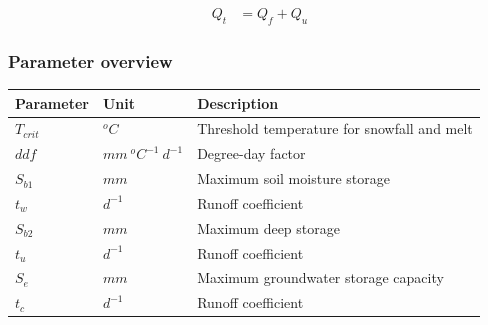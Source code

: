 \begin{align}
	Q_t &= Q_f + Q_u
\end{align}

\subsubsection{Parameter overview}
\begin{table}[htbp]
  \centering
    \begin{tabular}{lll}
    \toprule
    Parameter & Unit  & Description \\
    \midrule
    $T_{crit}$ & $^oC$ & Threshold temperature for snowfall and melt \\
    $ddf$ & $mm~^oC^{-1}~d^{-1}$ & Degree-day factor \\
    $S_{b1}$ & $mm$  & Maximum soil moisture storage \\
    $t_w$ & $d^{-1}$ & Runoff coefficient \\
    $S_{b2}$ & $mm$  & Maximum deep storage \\
    $t_u$ & $d^{-1}$ & Runoff coefficient \\
    $S_e$ & $mm$  & Maximum groundwater storage capacity \\
    $t_c$ & $d^{-1}$ & Runoff coefficient \\
    \bottomrule
    \end{tabular}%
  \label{tab:addlabel}%
\end{table}%

